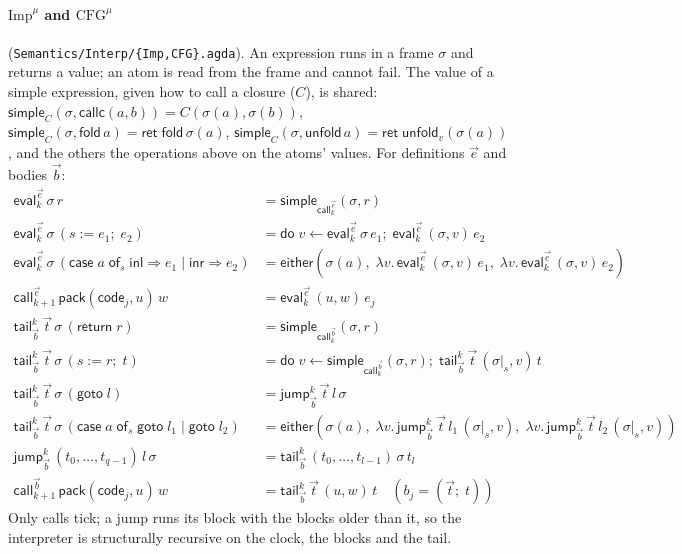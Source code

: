 \documentclass[10pt]{article}
\theoremstyle{acmplain}
\newcommand{\key}[1]{\mathsf{#1}}
\newcommand{\codeV}[1]{\key{code}_{#1}}
\newcommand{\assign}[3]{#1 \mathrel{:=} #2;\; #3}
\newcommand{\Casei}[4]{\key{case}\;#1\;\key{of}_{#2}\;\key{inl} \Rightarrow #3 \mid \key{inr} \Rightarrow #4}
\newcommand{\Ret}{\key{ret}\;}
\newcommand{\Do}{\key{do}\;}
\newcommand{\EV}[2]{\key{eval}^{#1}_{#2}}
\newcommand{\CALL}[2]{\key{call}^{#1}_{#2}}
\newcommand{\Tpack}[2]{\key{pack}(#1, #2)}     %
\newcommand{\Tcallc}[2]{\key{callc}(#1, #2)}   %
\newcommand{\Treturn}[1]{\key{return}\;#1}
\newcommand{\Tgoto}[1]{\key{goto}\;#1}
\newcommand{\Tcase}[4]{\key{case}\;#1\;\key{of}_{#2}\;\key{goto}\;#3 \mid \key{goto}\;#4}
\newcommand{\Tcut}[2]{#1|_{#2}}                %
\newcommand{\Ml}[1]{\textrm{#1}^{\mu}}                  %
\newcommand{\Mfold}{\key{fold}\,}
\newcommand{\Munfold}{\key{unfold}\,}
\begin{document}
\paragraph{$\Ml{Imp}$ and $\Ml{CFG}$} (\texttt{Semantics/Interp/\{Imp,CFG\}.agda}).
An expression runs in a frame $\sigma$ and returns a value; an atom is read
from the frame and cannot fail. The value of a simple expression, given
how to call a closure ($C$), is shared: $\key{simple}_C(\sigma, \Tcallc{a}{b}) =
C(\sigma(a), \sigma(b))$, $\key{simple}_C(\sigma, \Mfold a) = \Ret \Mfold
\sigma(a)$, $\key{simple}_C(\sigma, \Munfold a) = \Ret
\key{unfold}_v(\sigma(a))$, and the others the operations above on the
atoms' values. For definitions $\vec{e}$ and bodies $\vec{b}$:
\begin{align*}
  \EV{\vec{e}}{k}\,\sigma\,r &= \key{simple}_{\CALL{\vec{e}}{k}}(\sigma, r) \\
  \EV{\vec{e}}{k}\,\sigma\,(\assign{s}{e_1}{e_2}) &=
    \Do v \leftarrow \EV{\vec{e}}{k}\,\sigma\,e_1;\; \EV{\vec{e}}{k}\,(\sigma, v)\,e_2 \\
  \EV{\vec{e}}{k}\,\sigma\,(\Casei{a}{s}{e_1}{e_2}) &=
    \key{either}(\sigma(a),\; \lambda v.\, \EV{\vec{e}}{k}\,(\sigma, v)\,e_1,\;
      \lambda v.\, \EV{\vec{e}}{k}\,(\sigma, v)\,e_2) \\
  \CALL{\vec{e}}{k+1}\,\Tpack{\codeV{j}}{u}\,w &= \EV{\vec{e}}{k}\,(u, w)\,e_j \\[1ex]
  \key{tail}^k_{\vec{b}}\,\vec{t}\,\sigma\,(\Treturn{r}) &= \key{simple}_{\CALL{\vec{b}}{k}}(\sigma, r) \\
  \key{tail}^k_{\vec{b}}\,\vec{t}\,\sigma\,(\assign{s}{r}{t}) &=
    \Do v \leftarrow \key{simple}_{\CALL{\vec{b}}{k}}(\sigma, r);\;
    \key{tail}^k_{\vec{b}}\,\vec{t}\,(\Tcut{\sigma}{s}, v)\,t \\
  \key{tail}^k_{\vec{b}}\,\vec{t}\,\sigma\,(\Tgoto{l}) &= \key{jump}^k_{\vec{b}}\,\vec{t}\,l\,\sigma \\
  \key{tail}^k_{\vec{b}}\,\vec{t}\,\sigma\,(\Tcase{a}{s}{l_1}{l_2}) &=
    \key{either}(\sigma(a),\; \lambda v.\, \key{jump}^k_{\vec{b}}\,\vec{t}\,l_1\,(\Tcut{\sigma}{s}, v),\;
      \lambda v.\, \key{jump}^k_{\vec{b}}\,\vec{t}\,l_2\,(\Tcut{\sigma}{s}, v)) \\
  \key{jump}^k_{\vec{b}}\,(t_0, \ldots, t_{q-1})\,l\,\sigma &= \key{tail}^k_{\vec{b}}\,(t_0, \ldots, t_{l-1})\,\sigma\,t_l \\
  \CALL{\vec{b}}{k+1}\,\Tpack{\codeV{j}}{u}\,w &= \key{tail}^k_{\vec{b}}\,\vec{t}\,(u, w)\,t
    \quad (b_j = (\vec{t};\; t))
\end{align*}
Only calls tick; a jump runs its block with the blocks older than it, so
the interpreter is structurally recursive on the clock, the blocks and the
tail.
\end{document}
